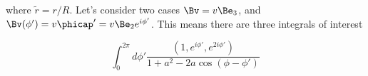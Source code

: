 where \( \tilde{r} = r/R \).
Let's consider two cases \( \Bv = v \Be_3 \), and \( \Bv(\phi') = v \phicap' = v \Be_2 e^{i\phi'} \).  This means there are three integrals of interest

\begin{dmath}\label{eqn:cylinderField:120}
\int_0^{2 \pi} d\phi' \frac{(1, e^{i\phi'}, e^{2 i\phi'})}{1 + a^2 - 2 a \cos(\phi-\phi')}
\end{dmath}

